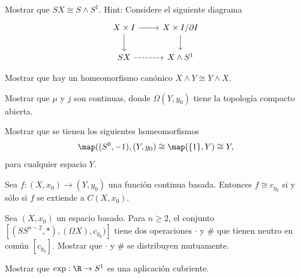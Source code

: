 \begin{ejercicio}
\label{eje:SX cong S wedge S1}
    Mostrar que $SX\cong S\wedge S^1$. Hint: Considere el siguiente diagrama
    \begin{equation*}
        \begin{tikzcd}
            X\times I\arrow[r]\arrow[d] & X\times I/\partial I\arrow[d]\\
            SX\arrow[r,dashed] & X\wedge S^1
        \end{tikzcd}
    \end{equation*}
\end{ejercicio}

\begin{ejercicio}
\label{eje:X wedge Y conmute}
    Mostrar que hay un homeomorfismo canónico $X\wedge Y\cong Y\wedge X$.
\end{ejercicio}

\begin{ejercicio}
    Mostrar que $\mu$ y $j$ son continuas, donde $\Omega(Y,y_0)$ tiene la topología compacto abierta.
\end{ejercicio}

\begin{ejercicio}
    Mostrar que se tienen los siguientes homeomorfismos
    \begin{equation*}
        \map((S^0,-1),(Y,y_0)\cong \map(\{1\},Y)\cong Y,
    \end{equation*}
    para cualquier espacio $Y$.
\end{ejercicio}

\begin{ejercicio}
\label{eje:f extended to CX}
    Sea $f:(X,x_0)\to(Y,y_0)$ una función continua basada. Entonces $f\cong c_{y_0}$ si y sólo si $f$ se extiende a $C(X,x_0)$.
\end{ejercicio}

\begin{ejercicio}
\label{eje: dot and cat distributive}
    Sea $(X,x_0)$ un espacio basado. Para $n\geq 2$, el conjunto $[(SS^{n-2},*),(\Omega X),c_{y_0})]$ tiene dos operaciones $\cdot$ y $\#$ que tienen neutro en común $[c_{y_0}]$. Mostrar que $\cdot$ y $\#$ se distribuyen mutuamente.
\end{ejercicio}

\begin{ejercicio}
    Mostrar que $\exp:\R\to S^1$ es una aplicación cubriente.
\end{ejercicio}

